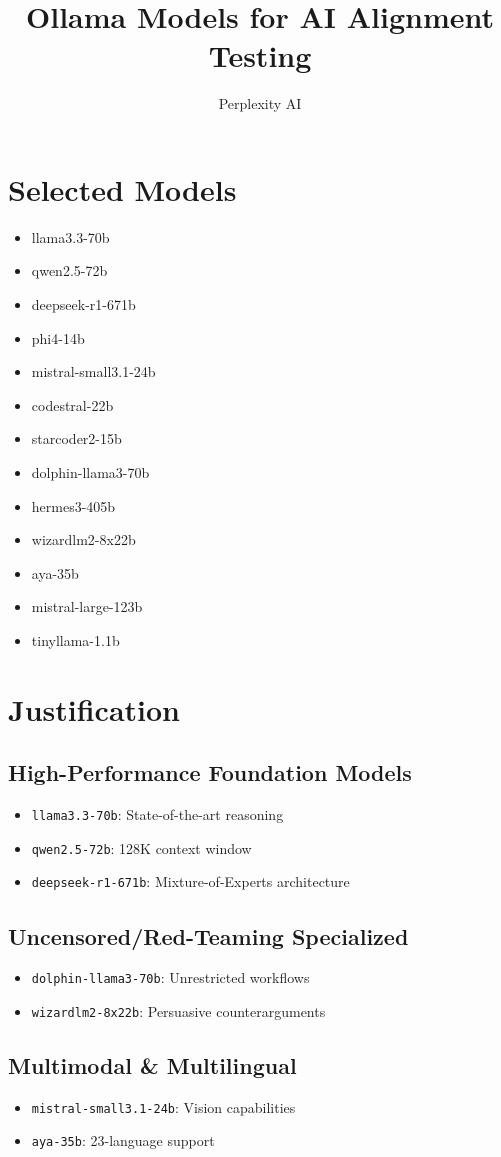 \documentclass{article}
\title{Ollama Models for AI Alignment Testing}
\author{Perplexity AI}
\begin{document}
\maketitle

\section{Selected Models}
\begin{itemize}
    \item llama3.3-70b
    \item qwen2.5-72b
    \item deepseek-r1-671b
    \item phi4-14b
    \item mistral-small3.1-24b
    \item codestral-22b
    \item starcoder2-15b
    \item dolphin-llama3-70b
    \item hermes3-405b
    \item wizardlm2-8x22b
    \item aya-35b
    \item mistral-large-123b
    \item tinyllama-1.1b
\end{itemize}

\section{Justification}
\subsection{High-Performance Foundation Models}
\begin{itemize}
    \item \texttt{llama3.3-70b}: State-of-the-art reasoning \cite{text2latex}
    \item \texttt{qwen2.5-72b}: 128K context window \cite{vertopal}
    \item \texttt{deepseek-r1-671b}: Mixture-of-Experts architecture \cite{yeschat2024}
\end{itemize}

\subsection{Uncensored/Red-Teaming Specialized}
\begin{itemize}
    \item \texttt{dolphin-llama3-70b}: Unrestricted workflows \cite{aichat2024}
    \item \texttt{wizardlm2-8x22b}: Persuasive counterarguments \cite{gptstore2021}
\end{itemize}

\subsection{Multimodal \& Multilingual}
\begin{itemize}
    \item \texttt{mistral-small3.1-24b}: Vision capabilities \cite{reddit2023}
    \item \texttt{aya-35b}: 23-language support \cite{yeschat2024}
\end{itemize}



\end{document}
